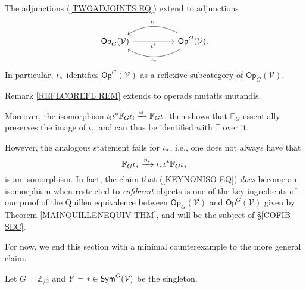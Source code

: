 \documentclass[a4paper,10pt]{article}%
\begin{document}
\begin{corollary}\label{TWOADJOINTSOP_COR}
	The adjunctions (\ref{TWOADJOINTS EQ}) extend to  adjunctions
\[
\begin{tikzcd}[column sep =5em]
	\mathsf{Op}_G(\mathcal{V}) \ar{r}[swap]{\iota^{\**}} 
	&
	\mathsf{Op}^G(\mathcal{V})
	\ar[bend right]{l}[swap,midway]{\iota_{!}}
	\ar[bend left]{l}{\iota_{\**}}.
\end{tikzcd}
\]
In particular, $\iota_{\**}$
identifies $\mathsf{Op}^G(\mathcal{V})$ as a reflexive subcategory of 
$\mathsf{Op}_G(\mathcal{V})$.
\end{corollary}

\begin{remark}\label{MUTMUT REM}
	Remark \ref{REFLCOREFL REM} extends to operads mutatis mutandis.
	
Moreover, the isomorphism
	$\iota_{!}\iota^{\**} \mathbb{F}_G \iota_{!}
	\xrightarrow{\epsilon_!}
	\mathbb{F}_G \iota_{!}$
then shows that $\mathbb{F}_G$ essentially preserves the image of $\iota_!$, and can thus be identified with $\mathbb{F}$ over it.

However, the analogous statement fails for $\iota_{\**}$, i.e., one does not always have that
\begin{equation}\label{KEYNONISO EQ}
	\mathbb{F}_G \iota_{\**}
	\xrightarrow{\eta_{\**}}
	\iota_{\**}\iota^{\**} \mathbb{F}_G \iota_{\**}
\end{equation}
is an isomorphism. 
In fact, the claim that (\ref{KEYNONISO EQ})
\textit{does} become an isomorphism when restricted to \textit{cofibrant} objects is one of the key ingredients of our proof of the Quillen equivalence between 
$\mathsf{Op}_G(\mathcal{V})$ and
$\mathsf{Op}^G(\mathcal{V})$
given by Theorem \ref{MAINQUILLENEQUIV THM}, 
and will be the subject of \S \ref{COFIB SEC}.

For now, we end this section with a minimal counterexample to  the more general claim.

Let $G=\mathbb{Z}_{/2}$ and 
$Y=\** \in \mathsf{Sym}^G(\mathcal{V})$ be the singleton.


\end{remark}
\end{document}
